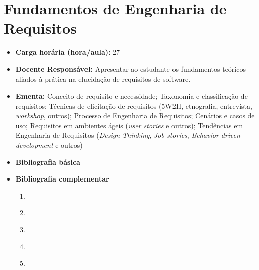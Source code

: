 \documentclass[11pt,fleqn]{book} %
\begin{document}
\section{Fundamentos de Engenharia de Requisitos}\label{3_engreq}
\begin{itemize}
	\item \textbf{Carga horária (hora/aula):} 27
	\item \textbf{Docente Responsável:} Apresentar ao estudante os fundamentos teóricos aliados à prática na elucidação de requisitos de software.
	\item \textbf{Ementa:} 
	Conceito de requisito e necessidade;
	Taxonomia e classificação de requisitos;
	Técnicas de elicitação de requisitos (5W2H, etnografia, entrevista, \textit{workshop}, outros);
	Processo de Engenharia de Requisitos;
	Cenários e casos de uso;
	Requisitos em ambientes ágeis (\textit{user stories} e outros);
	Tendências em Engenharia de Requisitos (\textit{Design Thinking}, \textit{Job stories}, \textit{Behavior driven development} e outros)
	\item \textbf{Bibliografia básica}
	\item \textbf{Bibliografia complementar}
	\begin{enumerate}
		\item \cite{sommerville2011engenharia}
		\item \cite{wazlawick2011analise}
		\item \cite{fowler_tortello_2005}
		\item \cite{teruel_2012}
		\item \cite{gamma_helm_johnson_vlissides_2000}
	\end{enumerate}
\end{itemize}


\newpage
\end{document}
